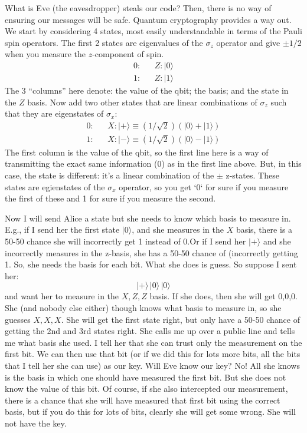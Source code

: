 \documentclass[prd,amsmath,aps,floats,amssymb, floatfix,
  superscriptaddress,nofootinbib]{revtex4-1}
\def\vs{\nonumber\\}
\numberwithin{equation}{section}
\newcommand\be{\begin{equation}}
\newcommand\ee{\end{equation}}
\def\bea{\begin{eqnarray}}
\def\eea{\end{eqnarray}}
\begin{document}
What is Eve (the eavesdropper) steals our code? Then, there is no way of ensuring our messages will be safe. Quantum cryptography provides a way out. We start by considering 4 states, most easily understandable in terms of the Pauli spin operators. The first 2 states are eigenvalues of the $\sigma_z$ operator and give $\pm1/2$ when you measure the $z$-component of spin. 
\bea
0: && Z:|0\rangle
\vs
1: &&Z:|1\rangle\eea
The 3 ``columns'' here denote: the value of the qbit; the basis; and the state in the $Z$ basis.
Now add two other states that are linear combinations of $\sigma_z$ such that they are eigenstates of $\sigma_x$:
\bea
0: && X:|+\rangle\equiv (1/\sqrt{2})\left( |0\rangle + |1\rangle\right)
\vs
1: && X:|-\rangle\equiv (1/\sqrt{2})\left( |0\rangle - |1\rangle\right)
\eea
The first column is the value of the qbit, so the first line here is a way of transmitting the exact same information (0) as in the first line above. But, in this case, the state is different: it's a linear combination of the $\pm$ z-states. These states are egienstates of the $\sigma_x$ operator, so you get `0` for sure if you measure the first of these and 1 for sure if you measure the second.

Now I will send Alice a state but she needs to know which basis to measure in. E.g., if I send her the first state $|0\rangle$, and she measures in the $X$ basis, there is a 50-50 chance she will incorrectly get 1 instead of 0.Or if I send her $|+\rangle$ and she incorrectly measures in the z-basis, she has a 50-50 chance of (incorrectly getting 1. So, she needs the basis for each bit. What she does is guess. So suppose I sent her:
\be
|+\rangle\, |0\rangle\, |0\rangle
\ee
 and want her to measure in the $X,Z,Z$ basis. If she does, then she will get 0,0,0. She (and nobody else either) though knows what basis to measure in, so she guesses $X,X,X$. She will get the first state right, but only have a 50-50 chance of getting the 2nd and 3rd states right. She calls me up over a public line and tells me what basis she used. I tell her that she can trust only the measurement on the first bit. We can then use that bit (or if we did this for lots more bits, all the bits that I tell her she can use) as our key. Will Eve know our key? No! All she knows is the basis in which one should have measured the first bit. But she does not know the value of this bit. Of course, if she also intercepted our measurement, there is a chance that she will have measured that first bit using the correct basis, but if you do this for lots of bits, clearly she will get some wrong. She will not have the key.
 
\end{document}
